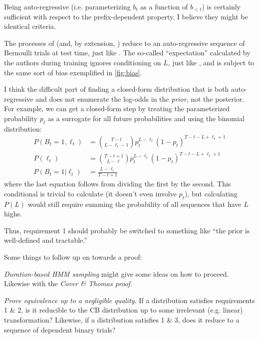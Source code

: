 \documentclass{article}
\begin{document}
Being auto-regressive (i.e. parameterizing $b_t$ as a function of $b_{<t}$) is
certainly sufficient with respect to the prefix-dependent property. I believe
they might be identical criteria.

The processes of \citet{raffelOnlineLineartimeAttention2017} (and, by
extension, \citet{chiuMonotonicChunkwiseAttention2018}) reduce to an
auto-regressive sequence of Bernoulli trials at test time, just like
\citeauthor{luoLearningOnlineAlignments2017}. The so-called ``expectation''
calculated by the authors during training ignores conditioning on $L$, just
like \citeauthor{luoLearningOnlineAlignments2017}, and is subject to the same
sort of bias exemplified in \cref{fig:bias}.

I think the difficult part of finding a closed-form distribution that is both
auto-regressive and does not enumerate the log-odds in the \emph{prior}, not
the posterior. For example, we can get a closed-form step by treating the
parameterized probability $p_t$ as a surrogate for all future probabilities and
using the binomial distribution:
%
\begin{equation*}
\begin{split}
    P(B_t = 1, \ell_t) &=
        \binom{T - t}{L - \ell_t - 1} p_t^{L - \ell_t}
                                      (1 - p_t)^{T - t - L + \ell_t + 1} \\
    P(\ell_t) &= \binom{T - t + 1}{L - \ell} p_t^{L - \ell_t}
                                      (1 - p_t)^{T - t - L + \ell_t + 1} \\
    P(B_t = 1|\ell_t) &= \frac{L - \ell_t}{T - t + 1}
\end{split}
\end{equation*}
%
where the last equation follows from dividing the first by the second. This
conditional is trivial to calculate (it doesn't even involve $p_t$), but
calculating $P(L)$ would still require summing the probability of all sequences
that have $L$ highs.

Thus, requirement 1 should probably be switched to something like ``the
prior is well-defined and tractable.''

Some things to follow up on towards a proof:

\emph{Duration-based HMM sampling} might give some ideas on how to proceed.
Likewise with the \emph{Cover \& Thomas proof}.

\emph{Prove equivalence up to a negligible quality}. If a distribution
satisfies requirements 1 \& 2, is it reducible to the CB distribution up to
some irrelevant (e.g. linear) transformation? Likewise, if a distribution
satisfies 1 \& 3, does it reduce to a sequence of dependent binary trials?
\end{document}
